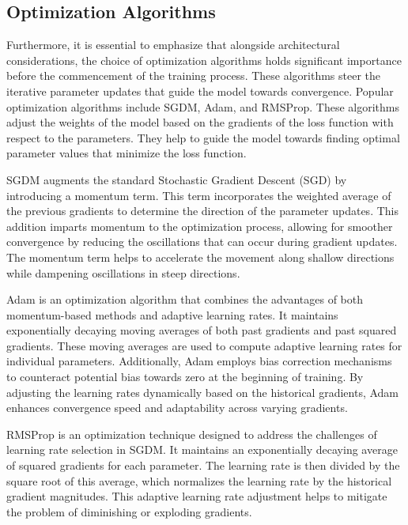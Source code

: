 \subsection{Optimization Algorithms}
Furthermore, it is essential to emphasize that alongside architectural considerations, the choice of optimization algorithms holds significant importance before the commencement of the training process. These algorithms steer the iterative parameter updates that guide the model towards convergence. Popular optimization algorithms include \ac{SGDM}\cite{liuImprovedAnalysisStochastic2020}, \ac{Adam}\cite{zhangImprovedAdamOptimizer2018}, and \ac{RMSProp}\cite{liDeepConvolutionGated2021}. These algorithms adjust the weights of the model based on the gradients of the loss function with respect to the parameters. They help to guide the model towards finding optimal parameter values that minimize the loss function.

\ac{SGDM} augments the standard Stochastic Gradient Descent (SGD) by introducing a momentum term. This term incorporates the weighted average of the previous gradients to determine the direction of the parameter updates. This addition imparts momentum to the optimization process, allowing for smoother convergence by reducing the oscillations that can occur during gradient updates\cite{zhangComputerVisionbasedTree2021}. The momentum term helps to accelerate the movement along shallow directions while dampening oscillations in steep directions. 

\ac{Adam} is an optimization algorithm that combines the advantages of both momentum-based methods and adaptive learning rates. It maintains exponentially decaying moving averages of both past gradients and past squared gradients\cite{zhangRobotGraspingMethod2021}. These moving averages are used to compute adaptive learning rates for individual parameters. Additionally, \ac{Adam} employs bias correction mechanisms to counteract potential bias towards zero at the beginning of training. By adjusting the learning rates dynamically based on the historical gradients, \ac{Adam} enhances convergence speed and adaptability across varying gradients\cite{zhangRobotGraspingMethod2021}.

\ac{RMSProp} is an optimization technique designed to address the challenges of learning rate selection in \ac{SGDM}. It maintains an exponentially decaying average of squared gradients for each parameter. The learning rate is then divided by the square root of this average, which normalizes the learning rate by the historical gradient magnitudes. This adaptive learning rate adjustment helps to mitigate the problem of diminishing or exploding gradients\cite{escobar-naranjoSelfsupervisedLearningApproach2023}.


